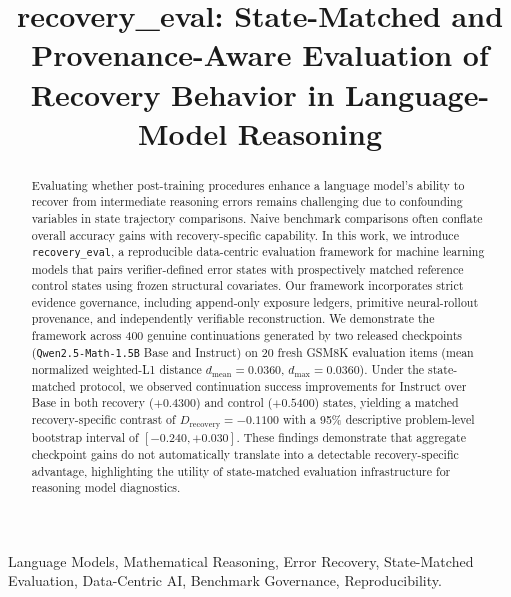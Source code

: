 \documentclass[10pt,conference]{IEEEtran}
\begin{document}
\title{recovery\_eval: State-Matched and Provenance-Aware Evaluation of Recovery Behavior in Language-Model Reasoning}

\author{
}

\maketitle

\begin{abstract}
Evaluating whether post-training procedures enhance a language model's ability to recover from intermediate reasoning errors remains challenging due to confounding variables in state trajectory comparisons. Naive benchmark comparisons often conflate overall accuracy gains with recovery-specific capability. In this work, we introduce \texttt{recovery\_eval}, a reproducible data-centric evaluation framework for machine learning models that pairs verifier-defined error states with prospectively matched reference control states using frozen structural covariates. Our framework incorporates strict evidence governance, including append-only exposure ledgers, primitive neural-rollout provenance, and independently verifiable reconstruction. We demonstrate the framework across 400 genuine continuations generated by two released checkpoints (\texttt{Qwen2.5-Math-1.5B} Base and Instruct) on 20 fresh GSM8K evaluation items (mean normalized weighted-L1 distance $d_{\text{mean}} = 0.0360$, $d_{\max} = 0.0360$). Under the state-matched protocol, we observed continuation success improvements for Instruct over Base in both recovery ($+0.4300$) and control ($+0.5400$) states, yielding a matched recovery-specific contrast of $D_{\text{recovery}} = -0.1100$ with a 95\% descriptive problem-level bootstrap interval of $[-0.240, +0.030]$. These findings demonstrate that aggregate checkpoint gains do not automatically translate into a detectable recovery-specific advantage, highlighting the utility of state-matched evaluation infrastructure for reasoning model diagnostics.
\end{abstract}

\begin{IEEEkeywords}
Language Models, Mathematical Reasoning, Error Recovery, State-Matched Evaluation, Data-Centric AI, Benchmark Governance, Reproducibility.
\end{IEEEkeywords}
\end{document}
